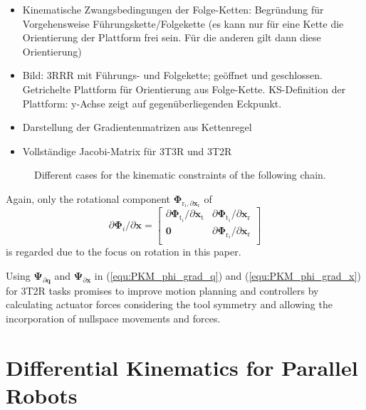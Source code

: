 \documentclass[robotics,article,submit,moreauthors,pdftex]{Definitions/mdpi}
\newcommand{\bm}[1]{\boldsymbol{#1}}
\begin{document}
\begin{itemize}
    \item Kinematische Zwangsbedingungen der Folge-Ketten: Begründung für Vorgehensweise Führungskette/Folgekette (es kann nur für eine Kette die Orientierung der Plattform frei sein. Für die anderen gilt dann diese Orientierung)
    \item Bild: 3RRR mit Führungs- und Folgekette; geöffnet und geschlossen. Getrichelte Plattform für Orientierung aus Folge-Kette. KS-Definition der Plattform: y-Achse zeigt auf gegenüberliegenden Eckpunkt.
    \item Darstellung der Gradientenmatrizen aus Kettenregel
    \item Vollständige Jacobi-Matrix für 3T3R und 3T2R
\end{itemize}



\begin{figure}[tb]
    
    \caption{Different cases for the kinematic constraints of the following chain.}
    \label{fig:pkm_constr_rot_follow}
\end{figure} 




Again, only the rotational component $\bm{\Phi}_{\mathrm{r}_i,\partial \bm{x}_{\mathrm{r}}}$ of 
%
\begin{equation}
\partial \bm{\Phi}_i/\partial \bm{x}
=
\begin{bmatrix}
\partial\bm{\Phi}_{\mathrm{t}_i}/\partial \bm{x}_{\mathrm{t}} & \partial\bm{\Phi}_{\mathrm{t}_i}/\partial \bm{x}_{\mathrm{r}} \\
\bm{0} & \partial\bm{\Phi}_{\mathrm{r}_i}/\partial \bm{x}_{\mathrm{r}} \\
\end{bmatrix}
\end{equation}
is regarded due to the focus on rotation in this paper.

Using $\bm{\Psi}_{\partial \bm{q}}$ and $\bm{\Psi}_{\partial \bm{x}}$ in (\ref{equ:PKM_phi_grad_q}) and (\ref{equ:PKM_phi_grad_x}) for 3T2R tasks promises to improve motion planning and controllers by calculating actuator forces considering the tool symmetry and allowing the incorporation of nullspace movements and forces.


\section{Differential Kinematics for Parallel Robots}
\label{sec:ZB_Anwendung}
\end{document}
